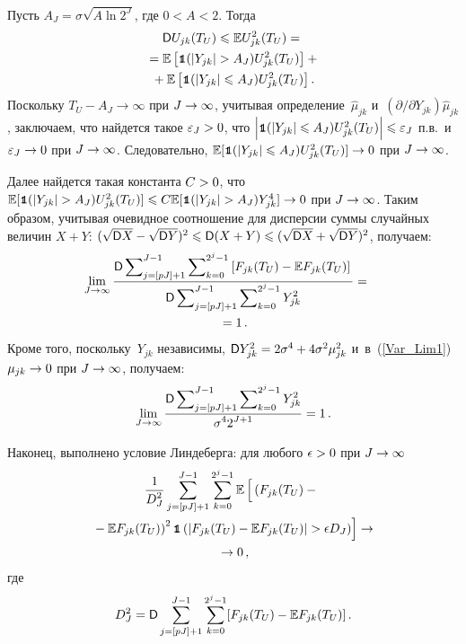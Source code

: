 \begin{multicols}{2}
\begin{multline*}
\end{multline*}
Пусть $A_J=\sigma\sqrt{A\ln 2^J}$, где $0<A<2$. Тогда
\begin{multline*}
{\sf D} U_{jk}(T_U)\leqslant \mathbb{E} U^2_{jk}(T_U)={}\\
{}=\mathbb{E} 
\left[\mbox{{\small \tt {1}}\hspace{-1.3mm}{\tt 1}}(\left\vert Y_{jk}\right\vert>A_J)U^2_{jk}(T_U)\right]+{}\\
{}+
\mathbb{E}\left[\mbox{{\small \tt {1}}\hspace{-1.3mm}{\tt 1}}(\left\vert Y_{jk}\right\vert\leqslant A_J)U^2_{jk}(T_U)\right].
\end{multline*}
Поскольку $T_U-A_J\to\infty$ при $J\hm\to\infty$, учитывая 
определение~$\widehat{\mu}_{jk}$ и~$({\partial}/{\partial Y_{jk}})\widehat{\mu}_{jk}$, 
заключаем, что найдется такое $\varepsilon_J\hm>0$, что 
$\abs{\Ik(\abs{Y_{jk}}\hm\leqslant A_J)U^2_{jk}(T_U)}\hm\leqslant\varepsilon_J$ п.в.\ 
и~$\varepsilon_J\hm\to0$ при $J\hm\to\infty$. Следовательно, 
$\Expect[\Ik(\abs{Y_{jk}}\hm\leqslant A_J)U^2_{jk}(T_U)]\hm\to 0$ при $J\hm\to\infty$.

Далее найдется такая константа $C\hm>0$, что 
$\Expect [\Ik(\abs{Y_{jk}}\hm>A_J)U^2_{jk}(T_U)]\hm\leqslant 
C\Expect[\Ik(\abs{Y_{jk}}\hm>A_J)Y^4_{jk}]\hm\to0$ при $J\hm\to\infty$. Таким образом, 
учитывая очевидное соотношение для дисперсии суммы случайных величин $X+Y$: 
$(\sqrt{\D X}\hm-\sqrt{\D Y})^2\hm\leqslant\D(X+Y)
\hm\leqslant(\sqrt{\D X}\hm+\sqrt{\D Y})^2$, получаем:
\begin{multline}
\label{Var_Lim1}
\hspace*{-9.58pt}\lim\limits_{J\to\infty}\displaystyle\frac{\displaystyle {\sf D}\sum\nolimits_{j=[pJ]+1}^{J-1}
\sum\nolimits_{k=0}^{2^j-1}\left[F_{jk}(T_U)-\mathbb{E} F_{jk}(T_U)\right]\mathstrut}{\displaystyle {\sf D}\sum\nolimits_{j=[pJ]+1}^{J-1}\sum\nolimits_{k=0}^{2^j-1}Y^2_{jk}\mathstrut}={}\\
{}=1\,.
\end{multline}
Кроме того, поскольку~$Y_{jk}$ независимы, $\D Y^2_{jk}\hm=
2\sigma^4\hm+4\sigma^2\mu^2_{jk}$ и~в~(\ref{Var_Lim1}) $\mu_{jk}\hm\to0$ при 
$J\hm\to\infty$, получаем:
\begin{equation}
\label{Var_Lim2}
\lim\limits_{J\to\infty}\displaystyle\frac{\displaystyle {\sf D}\sum\nolimits_{j=[pJ]+1}^{J-1}
\sum\nolimits_{k=0}^{2^j-1}Y^2_{jk}\mathstrut}{\displaystyle \sigma^42^{J+1}\mathstrut}=1\,.
\end{equation}

Наконец, выполнено условие Линдеберга: для любого $\epsilon\hm>0$ при $J\hm\to\infty$
\begin{multline}
\label{Norm_Cond}
\displaystyle\frac{\displaystyle 1\mathstrut}{\displaystyle D^2_J\mathstrut}\sum\limits_{j=[pJ]+1}^{J-1}\sum\limits_{k=0}^{2^j-1} \mathbb{E}  
\left[
\vphantom{\left((T_U)\right)^2}\left( F_{jk}(T_U)-{}\right.\right.\\
\left.\left.{}-\mathbb{E} F_{jk}(T_U)\right)^2\mbox{{\small \tt {1}}\hspace{-1.3mm}{\tt 1}}\left( 
\left\vert F_{jk}(T_U)-\mathbb{E} F_{jk}(T_U)\right\vert >\epsilon D_J\right)
\right]\rightarrow{}\\
{}\rightarrow 0\,,
\end{multline}
где 
$$
D^2_J={\sf D}\sum\limits_{j=[pJ]+1}^{J-1}\sum\limits_{k=0}^{2^j-1}
[F_{jk}(T_U)-\mathbb{E} F_{jk}(T_U)]\,.
$$


\end{multicols}
